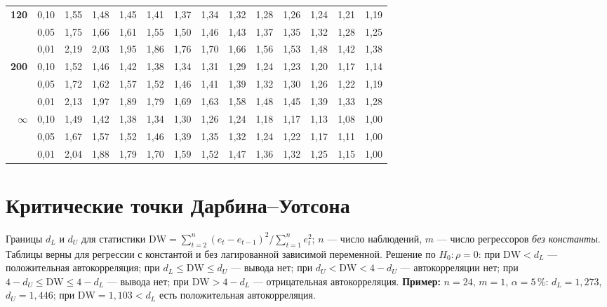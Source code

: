 \documentclass[12pt,a4paper]{article}
\begin{document}
{\begin{longtable}{@{\extracolsep{\fill}}rrrrrrrrrrrrrr@{}}
\addlinespace[1pt]
\textbf{120} & 0,10 & 1,55 & 1,48 & 1,45 & 1,41 & 1,37 & 1,34 & 1,32 & 1,28 & 1,26 & 1,24 & 1,21 & 1,19 \\*
 & 0,05 & 1,75 & 1,66 & 1,61 & 1,55 & 1,50 & 1,46 & 1,43 & 1,37 & 1,35 & 1,32 & 1,28 & 1,25 \\*
 & 0,01 & 2,19 & 2,03 & 1,95 & 1,86 & 1,76 & 1,70 & 1,66 & 1,56 & 1,53 & 1,48 & 1,42 & 1,38 \\
\addlinespace[1pt]
\textbf{200} & 0,10 & 1,52 & 1,46 & 1,42 & 1,38 & 1,34 & 1,31 & 1,29 & 1,24 & 1,23 & 1,20 & 1,17 & 1,14 \\*
 & 0,05 & 1,72 & 1,62 & 1,57 & 1,52 & 1,46 & 1,41 & 1,39 & 1,32 & 1,30 & 1,26 & 1,22 & 1,19 \\*
 & 0,01 & 2,13 & 1,97 & 1,89 & 1,79 & 1,69 & 1,63 & 1,58 & 1,48 & 1,45 & 1,39 & 1,33 & 1,28 \\
\addlinespace[1pt]
\textbf{$\infty$} & 0,10 & 1,49 & 1,42 & 1,38 & 1,34 & 1,30 & 1,26 & 1,24 & 1,18 & 1,17 & 1,13 & 1,08 & 1,00 \\*
 & 0,05 & 1,67 & 1,57 & 1,52 & 1,46 & 1,39 & 1,35 & 1,32 & 1,24 & 1,22 & 1,17 & 1,11 & 1,00 \\*
 & 0,01 & 2,04 & 1,88 & 1,79 & 1,70 & 1,59 & 1,52 & 1,47 & 1,36 & 1,32 & 1,25 & 1,15 & 1,00 \\
\end{longtable}
}

\clearpage
\section{Критические точки Дарбина--Уотсона}
\noindent Границы $d_L$ и $d_U$ для статистики
$\mathrm{DW} = \sum_{t=2}^{n}(e_t - e_{t-1})^2 / \sum_{t=1}^{n}e_t^2$;
$n$ — число наблюдений, $m$ — число регрессоров \emph{без константы}.
Таблицы верны для регрессии с константой и без лагированной зависимой
переменной. Решение по $H_0\colon \rho = 0$: при $\mathrm{DW} < d_L$ —
положительная автокорреляция; при $d_L \le \mathrm{DW} \le d_U$ — вывода нет;
при $d_U < \mathrm{DW} < 4 - d_U$ — автокорреляции нет; при
$4 - d_U \le \mathrm{DW} \le 4 - d_L$ — вывода нет; при $\mathrm{DW} > 4 - d_L$ —
отрицательная автокорреляция.
\textbf{Пример:} $n = 24$, $m = 1$, $\alpha = 5\,\%$: $d_L = 1{,}273$,
$d_U = 1{,}446$; при $\mathrm{DW} = 1{,}103 < d_L$ есть положительная
автокорреляция.
\end{document}
